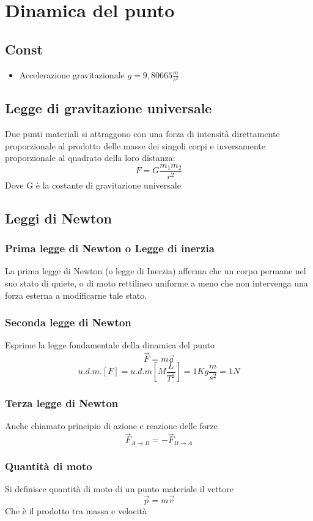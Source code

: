 \documentclass[a4paper]{report}
\begin{document}
  \chapter{Dinamica del punto}
  \section{Const}
  \begin{itemize}
    \item Accelerazione gravitazionale $g = 9,80665 \frac{m}{s^2}$
  \end{itemize}

  \section{Legge di gravitazione universale}
  Due punti materiali si attraggono con una forza di intensità direttamente proporzionale al prodotto delle masse dei singoli corpi e inversamente proporzionale al quadrato della loro distanza:
  \[ F = G \frac{m_1 m_2}{r^2} \]
  Dove G è la costante di gravitazione universale


  \section{Leggi di Newton}
  \subsection{Prima legge di Newton o Legge di inerzia}
  La prima legge di Newton (o legge di Inerzia) afferma che un corpo permane nel suo stato di quiete, o di moto rettilineo uniforme a meno che non intervenga una forza esterna a modificarne tale stato.


  \subsection{Seconda legge di Newton}
  Esprime la legge fondamentale della dinamica del punto
  \[ \vec{F} = m\vec{a} \]
  \[ u.d.m.[F] = u.d.m[M \frac{L}{T^2}] = 1Kg \frac{m}{s^2} = 1N\]

  \subsection{Terza legge di Newton}
  Anche chiamato principio di azione e reazione delle forze
  \[ \vec{F}_{A \rightarrow B} = -\vec{F}_{B \rightarrow A} \]

  \subsection{Quantità di moto}
  Si definisce quantità di moto di un punto materiale il vettore
  \[ \vec{p} = m\vec{v} \]
  Che è il prodotto tra massa e velocità
\end{document}
